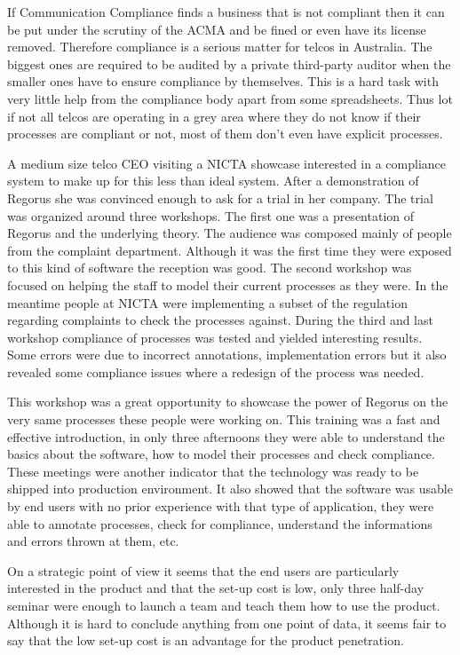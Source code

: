 \documentclass[10pt]{report}
\begin{document}
If Communication Compliance finds a business that is not compliant then it can be put under the scrutiny of the ACMA and be fined or even have its license removed. Therefore compliance is a serious matter for telcos in Australia. The biggest ones are required to be audited by a private third-party auditor when the smaller ones have to ensure compliance by themselves. This is a hard task with very little help from the compliance body apart from some spreadsheets. Thus lot if not all telcos are operating in a grey area where they do not know if their processes are compliant or not, most of them don't even have explicit processes.

A medium size telco CEO visiting a NICTA showcase interested in a compliance system to make up for this less than ideal system. After a demonstration of Regorus she was convinced enough to ask for a trial in her company. The trial was organized around three workshops. The first one was a presentation of Regorus and the underlying theory. The audience was composed mainly of people from the complaint department. Although it was the first time they were exposed to this kind of software the reception was good. The second workshop was focused on helping the staff to model their current processes as they were. In the meantime people at NICTA were implementing a subset of the regulation regarding complaints to check the processes against. During the third and last workshop compliance of processes was tested and yielded interesting results. Some errors were due to incorrect annotations, implementation errors but it also revealed some compliance issues where a redesign of the process was needed.

This workshop was a great opportunity to showcase the power of Regorus on the very same processes these people were working on. This training was a fast and effective introduction, in only three afternoons they were able to understand the basics about the software, how to model their processes and check compliance. These meetings were another indicator that the technology was ready to be shipped into production environment. It also showed that the software was usable by end users with no prior experience with that type of application, they were able to annotate processes, check for compliance, understand the informations and errors thrown at them, etc.

On a strategic point of view it seems that the end users are particularly interested in the product and that the set-up cost is low, only three half-day seminar were enough to launch a team and teach them how to use the product. Although it is hard to conclude anything from one point of data, it seems fair to say that the low set-up cost is an advantage for the product penetration. 
\end{document}
